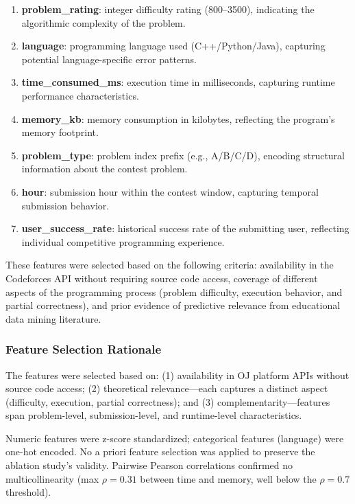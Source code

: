 \documentclass[10pt,a4paper]{article}
\begin{document}
\begin{enumerate}
    \item \textbf{problem\_rating}: integer difficulty rating (800--3500),
          indicating the algorithmic complexity of the problem.
    \item \textbf{language}: programming language used (C++/Python/Java),
          capturing potential language-specific error patterns.
    \item \textbf{time\_consumed\_ms}: execution time in milliseconds,
          capturing runtime performance characteristics.
    \item \textbf{memory\_kb}: memory consumption in kilobytes, reflecting
          the program's memory footprint.
    \item \textbf{problem\_type}: problem index prefix (e.g., A/B/C/D), encoding
          structural information about the contest problem.
    \item \textbf{hour}: submission hour within the contest window, capturing
          temporal submission behavior.
    \item \textbf{user\_success\_rate}: historical success rate of the submitting
          user, reflecting individual competitive programming experience.
\end{enumerate}

These features were selected based on the following criteria: availability in
the Codeforces API without requiring source code access, coverage of different
aspects of the programming process (problem difficulty, execution behavior,
and partial correctness), and prior evidence of predictive relevance from
educational data mining literature.

\subsubsection*{Feature Selection Rationale}
The features were selected based on: (1) availability in OJ platform APIs without source code access; (2) theoretical relevance---each captures a distinct aspect (difficulty, execution, partial correctness); and (3) complementarity---features span problem-level, submission-level, and runtime-level characteristics.

Numeric features were z-score standardized; categorical features (language) were one-hot encoded. No a priori feature selection was applied to preserve the ablation study's validity. Pairwise Pearson correlations confirmed no multicollinearity (max $\rho = 0.31$ between time and memory, well below the $\rho = 0.7$ threshold).
\end{document}
